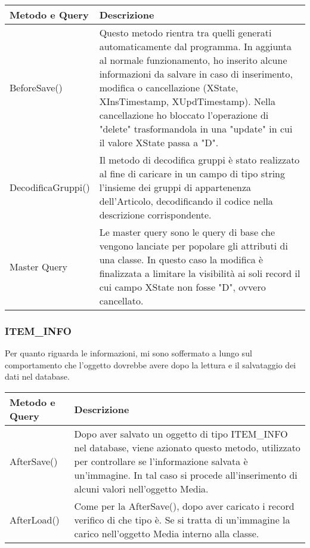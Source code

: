 \begin{center}
	\begin{tabular}{ p{3cm}|p{} }
		\hline
		\textbf{Metodo e Query} & \textbf{Descrizione}\\
		\hline
		BeforeSave() & Questo metodo rientra tra quelli generati automaticamente dal programma. In aggiunta al normale funzionamento, ho inserito alcune informazioni da salvare in caso di inserimento, modifica o cancellazione (XState, XInsTimestamp, XUpdTimestamp). Nella cancellazione ho bloccato l'operazione di "delete" trasformandola in una "update" in cui il valore XState passa a "D".\\
		\hline
		DecodificaGruppi() & Il metodo di decodifica gruppi è stato realizzato al fine di caricare in un campo di tipo string l'insieme dei gruppi di appartenenza dell'Articolo, decodificando il codice nella descrizione corrispondente.\\
		\hline
		Master Query & Le master query sono le query di base che vengono lanciate per popolare gli attributi di una classe. In questo caso la modifica è finalizzata a limitare la visibilità ai soli record il cui campo XState non fosse "D", ovvero cancellato.\\
	
	\end{tabular}

\end{center}

\subsubsection{ITEM\_INFO}
Per quanto riguarda le informazioni, mi sono soffermato a lungo sul comportamento che l'oggetto dovrebbe avere dopo la lettura e il salvataggio dei dati nel database. 
\begin{center}
	\begin{tabular}{ p{3cm}|p{} }
		\hline
		\textbf{Metodo e Query} & \textbf{Descrizione}\\
		\hline
		AfterSave() & Dopo aver salvato un oggetto di tipo ITEM\_INFO nel database, viene azionato questo metodo, utilizzato per controllare se l'informazione salvata è un'immagine. In tal  caso si procede all'inserimento di alcuni valori nell'oggetto Media.\\
		\hline
		AfterLoad() & Come per la AfterSave(), dopo aver caricato i record verifico di che tipo è. Se si tratta di un'immagine la carico nell'oggetto Media interno alla classe.\\
		
	\end{tabular}
\end{center}

